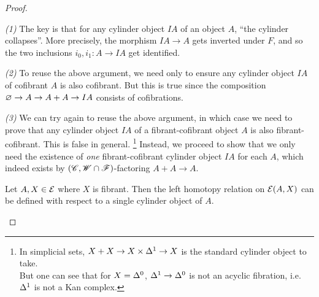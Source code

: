 \documentclass[./main.tex]{subfiles}
\begin{document}
\begin{proof}
\begin{lem}
\begin{proof1}
      \textit{(1)}
      The key is that for any cylinder object $IA$ of an object $A$,
      ``the cylinder collapses''.
      More precisely, the morphism $IA \to A$ gets inverted under $F$,
      and so the two inclusions $i_0, i_1 : A \to IA$ get identified.

      \textit{(2)}
      To reuse the above argument,
      we need only to ensure any cylinder object $IA$ of 
      cofibrant $A$ is also cofibrant.
      But this is true since the composition 
      $\varnothing \to A \to A + A \to IA$ consists of cofibrations.

      \textit{(3)}
      We can try again to reuse the above argument,
      in which case we need to prove that any cylinder object $IA$
      of a fibrant-cofibrant object $A$ is also fibrant-cofibrant.
      This is false in general. 
      \footnote{
        In simplicial sets, 
        $X + X \to X \times \Delta^1 \to X$
        is the standard cylinder object to take. \\
        But one can see that for $X = \Delta^0$, 
        $\Delta^1 \to \Delta^0$ is not an acyclic fibration,
        i.e. $\Delta^1$ is not a Kan complex.
      }
      Instead, we proceed to show that we only need the existence of \emph{one} 
      fibrant-cofibrant cylinder object $IA$ for each $A$,
      which indeed exists by $(\mathscr{C} , \mathscr{W} \cap \mathscr{F})$-factoring 
      $A + A \to A$.
      \begin{lem}

        Let $A, X \in \mathcal{E}$ where $X$ is fibrant.
        Then the left homotopy relation on $\mathcal{E}(A , X)$
        can be defined with respect to a single cylinder object of $A$.


\end{lem}
\end{proof1}
\end{lem}
\end{proof}
\end{document}
